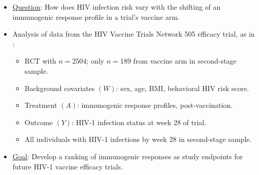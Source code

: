 \documentclass[landscape,a0paper,fontscale=0.285]{baposter} %
\newcommand{\compresslist}{ %
\setlength{\itemsep}{1pt}
\setlength{\parskip}{0pt}
\setlength{\parsep}{0pt}
}
\begin{document}
\begin{poster}
{\begin{itemize}\compresslist
\setlength\itemsep{0.5em}
\item \underline{Question}: How does HIV infection risk vary with the shifting
  of an immunogenic response profile in a trial's vaccine arm.
\item Analysis of data from the HIV Vaccine Trials Network 505 efficacy trial,
  as in \cite{janes2017higher}:
  \begin{itemize}
    \itemsep0.25pt
    \item RCT with $n = 2504$; only $n = 189$ from vaccine arm in second-stage
      sample.
    \item Background covariates $(W)$: sex, age, BMI, behavioral HIV risk score.
    \item Treatment $(A)$: immunogenic response profiles, post-vaccination.
    \item Outcome $(Y)$: HIV-1 infection status at week 28 of trial.
    \item All individuals with HIV-1 infections by week 28 in second-stage
      sample.
  \end{itemize}
\item \underline{Goal}: Develop a ranking of immunogenic responses as study
  endpoints for future HIV-1 vaccine efficacy trials.
\end{itemize}
}


\end{poster}
\end{document}
